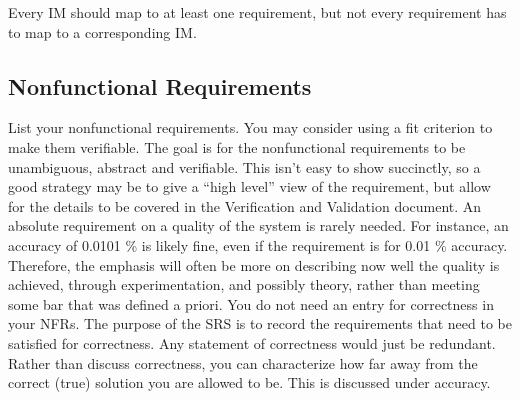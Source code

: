 \documentclass[12pt]{article}
\begin{document}
Every IM should map to at least one requirement, but not every requirement has
to map to a corresponding IM.

\subsection{Nonfunctional Requirements}

List your nonfunctional requirements.  You may consider using a fit criterion to
make them verifiable. The goal is for the nonfunctional requirements to be
unambiguous, abstract and verifiable.  This isn't easy to show succinctly, so a
good strategy may be to give a ``high level'' view of the requirement, but allow
for the details to be covered in the Verification and Validation document. An
absolute requirement on a quality of the system is rarely needed.  For instance,
an accuracy of 0.0101 \% is likely fine, even if the requirement is for 0.01 \%
accuracy.  Therefore, the emphasis will often be more on describing now well the
quality is achieved, through experimentation, and possibly theory, rather than
meeting some bar that was defined a priori. You do not need an entry for
correctness in your NFRs.  The purpose of the SRS is to record the requirements
that need to be satisfied for correctness. Any statement of correctness would
just be redundant. Rather than discuss correctness, you can characterize how far
away from the correct (true) solution you are allowed to be.  This is discussed
under accuracy.
\end{document}
